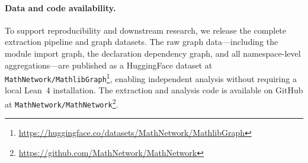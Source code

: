 \paragraph{Data and code availability.}
To support reproducibility and downstream research, we release the complete extraction pipeline and graph datasets. The raw graph data---including the module import graph, the declaration dependency graph, and all namespace-level aggregations---are published as a HuggingFace dataset at \texttt{MathNetwork/MathlibGraph}\footnote{\url{https://huggingface.co/datasets/MathNetwork/MathlibGraph}}, enabling independent analysis without requiring a local Lean~4 installation. The extraction and analysis code is available on GitHub at \texttt{MathNetwork/MathNetwork}\footnote{\url{https://github.com/MathNetwork/MathNetwork}}.

